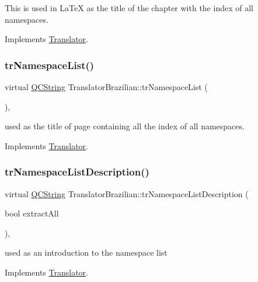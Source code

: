 This is used in La\+TeX as the title of the chapter with the index of all namespaces. 

Implements \mbox{\hyperlink{class_translator}{Translator}}.

\mbox{\label{class_translator_brazilian_a304502ed047a60cdd90de445702e4dfa}} 
\subsubsection{\texorpdfstring{trNamespaceList()}{trNamespaceList()}}
{\footnotesize\ttfamily virtual \mbox{\hyperlink{class_q_c_string}{Q\+C\+String}} Translator\+Brazilian\+::tr\+Namespace\+List (\begin{DoxyParamCaption}{ }\end{DoxyParamCaption})\hspace{0.3cm}{\ttfamily [inline]}, {\ttfamily [virtual]}}

used as the title of page containing all the index of all namespaces. 

Implements \mbox{\hyperlink{class_translator}{Translator}}.

\mbox{\label{class_translator_brazilian_a6cb6b5d11c94c3697670360b0768dfab}} 
\subsubsection{\texorpdfstring{trNamespaceListDescription()}{trNamespaceListDescription()}}
{\footnotesize\ttfamily virtual \mbox{\hyperlink{class_q_c_string}{Q\+C\+String}} Translator\+Brazilian\+::tr\+Namespace\+List\+Description (\begin{DoxyParamCaption}\item[{bool}]{extract\+All }\end{DoxyParamCaption})\hspace{0.3cm}{\ttfamily [inline]}, {\ttfamily [virtual]}}

used as an introduction to the namespace list 

Implements \mbox{\hyperlink{class_translator}{Translator}}.

